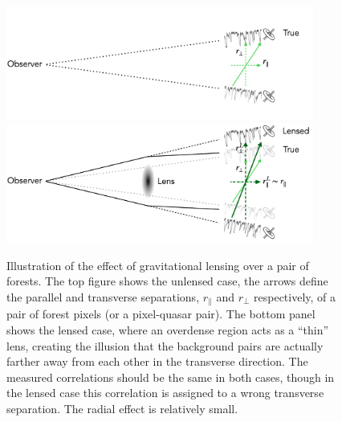 \begin{figure}
    \centering
    \includegraphics[width=0.9\textwidth]{fig/forests/unlensed_forests.png}
    \includegraphics[width=0.9\textwidth]{fig/forests/lensed_forests.png}
    \caption{Illustration of the effect of gravitational lensing over a pair
    of \lya forests. The top figure shows the unlensed case, the arrows 
    define the parallel and transverse separations, $r_\parallel$ and $r_\perp$
    respectively, of a pair of \lya forest pixels (or a pixel-quasar pair). 
    The bottom panel shows the lensed case, where an overdense region acts 
    as a ``thin'' lens, creating the illusion that the background pairs are actually 
    farther away from each other in the transverse direction. 
    The measured correlations should be the same in both cases, though in the lensed 
    case this correlation is assigned to a wrong transverse separation. 
    The radial effect is relatively small.  
    }
    \label{fig:weak_lensing_forests}
\end{figure}


